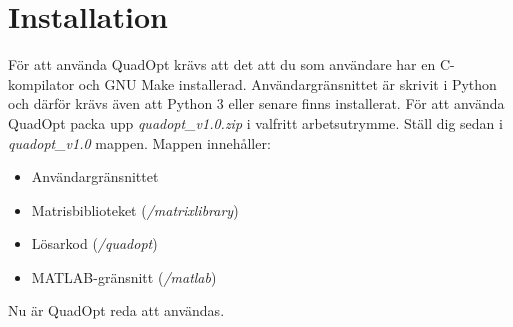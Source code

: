 \section{Installation}
För att använda QuadOpt krävs att det att du som användare har en C-kompilator och GNU Make installerad. Användargränsnittet är skrivit i Python och därför krävs även att Python 3 eller senare finns installerat.
\newline
\newline
För att använda QuadOpt packa upp \emph{quadopt\_v1.0.zip} i valfritt arbetsutrymme. Ställ dig sedan i \emph{quadopt\_v1.0} mappen. Mappen innehåller:

\begin{itemize}
  \item Användargränsnittet 
  \item Matrisbiblioteket (\emph{/matrixlibrary})
  \item Lösarkod (\emph{/quadopt})
  \item MATLAB-gränsnitt (\emph{/matlab}) 
\end{itemize}
Nu är QuadOpt reda att användas.